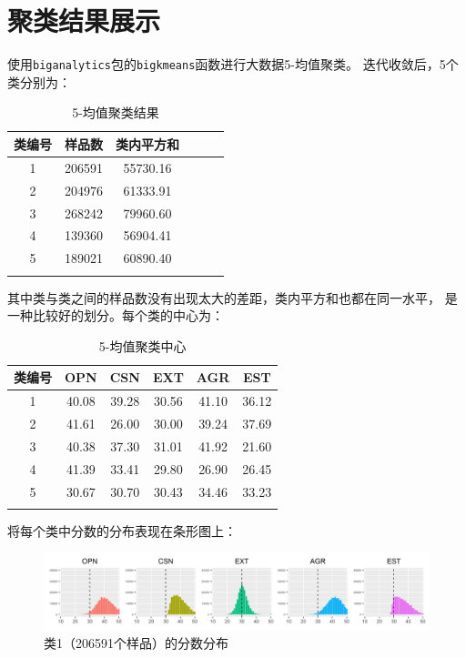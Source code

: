 \documentclass[UTF8]{ctexart}
\begin{document}
\section{聚类结果展示}
使用\texttt{biganalytics}包的\texttt{bigkmeans}函数进行大数据5-均值聚类。
迭代收敛后，5个类分别为：
\begin{longtable}{c|c|c|c|c|c}
  \hline
  类编号 & 样品数    & 类内平方和    \\\hline
  1   & 206591 & 55730.16 \\\hline
  2   & 204976 & 61333.91 \\\hline
  3   & 268242 & 79960.60 \\\hline
  4   & 139360 & 56904.41 \\\hline
  5   & 189021 & 60890.40 \\\hline
  \caption{5-均值聚类结果}
\end{longtable}
\noindent 其中类与类之间的样品数没有出现太大的差距，类内平方和也都在同一水平，
是一种比较好的划分。每个类的中心为：
\begin{longtable}{c|c|c|c|c|c}
  \hline
  类编号 & OPN   & CSN   & EXT   & AGR   & EST   \\\hline
  1   & 40.08 & 39.28 & 30.56 & 41.10 & 36.12 \\\hline
  2   & 41.61 & 26.00 & 30.00 & 39.24 & 37.69 \\\hline
  3   & 40.38 & 37.30 & 31.01 & 41.92 & 21.60 \\\hline
  4   & 41.39 & 33.41 & 29.80 & 26.90 & 26.45 \\\hline
  5   & 30.67 & 30.70 & 30.43 & 34.46 & 33.23 \\\hline
  \caption{5-均值聚类中心}
  \label{center}
\end{longtable}
\noindent 将每个类中分数的分布表现在条形图上：
\begin{figure}[H]
  \centering
  \includegraphics[scale=0.478]{Cluster1.png}
  \caption{类1（206591个样品）的分数分布}
\end{figure}
\end{document}
